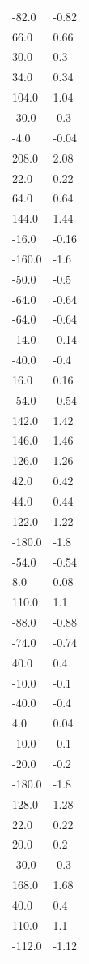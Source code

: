\begin{longtable}{ll}
-82.0 & -0.82 \\
66.0 & 0.66 \\
30.0 & 0.3 \\
34.0 & 0.34 \\
104.0 & 1.04 \\
-30.0 & -0.3 \\
-4.0 & -0.04 \\
208.0 & 2.08 \\
22.0 & 0.22 \\
64.0 & 0.64 \\
144.0 & 1.44 \\
-16.0 & -0.16 \\
-160.0 & -1.6 \\
-50.0 & -0.5 \\
-64.0 & -0.64 \\
-64.0 & -0.64 \\
-14.0 & -0.14 \\
-40.0 & -0.4 \\
16.0 & 0.16 \\
-54.0 & -0.54 \\
142.0 & 1.42 \\
146.0 & 1.46 \\
126.0 & 1.26 \\
42.0 & 0.42 \\
44.0 & 0.44 \\
122.0 & 1.22 \\
-180.0 & -1.8 \\
-54.0 & -0.54 \\
8.0 & 0.08 \\
110.0 & 1.1 \\
-88.0 & -0.88 \\
-74.0 & -0.74 \\
40.0 & 0.4 \\
-10.0 & -0.1 \\
-40.0 & -0.4 \\
4.0 & 0.04 \\
-10.0 & -0.1 \\
-20.0 & -0.2 \\
-180.0 & -1.8 \\
128.0 & 1.28 \\
22.0 & 0.22 \\
20.0 & 0.2 \\
-30.0 & -0.3 \\
168.0 & 1.68 \\
40.0 & 0.4 \\
110.0 & 1.1 \\
-112.0 & -1.12 \\

\end{longtable}
